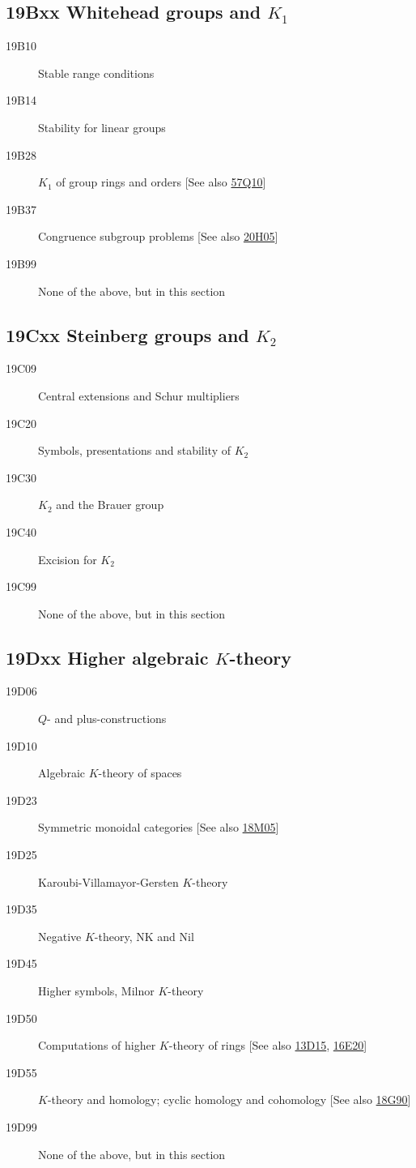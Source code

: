 \subsection*{19Bxx  Whitehead groups and $K_1$ }\label{19Bxx}
\begin{description}  
\item [19B10]\label{19B10} Stable range conditions
\item [19B14]\label{19B14} Stability for linear groups
\item [19B28]\label{19B28} $K_1$ of group rings and orders [See also \hyperref[57Q10]{57Q10}]
\item [19B37]\label{19B37} Congruence subgroup problems [See also \hyperref[20H05]{20H05}]
\item [19B99]\label{19B99} None of the above, but in this section
\end{description}
\subsection*{19Cxx  Steinberg groups and $K_2$ }\label{19Cxx}
\begin{description}  
\item [19C09]\label{19C09} Central extensions and Schur multipliers
\item [19C20]\label{19C20} Symbols, presentations and stability of $K_2$
\item [19C30]\label{19C30} $K_2$ and the Brauer group
\item [19C40]\label{19C40} Excision for $K_2$
\item [19C99]\label{19C99} None of the above, but in this section
\end{description}
\subsection*{19Dxx  Higher algebraic $K$-theory }\label{19Dxx}
\begin{description}  
\item [19D06]\label{19D06} $Q$- and plus-constructions
\item [19D10]\label{19D10} Algebraic $K$-theory of spaces
\item [19D23]\label{19D23} Symmetric monoidal categories [See also \hyperref[18M05]{18M05}]
\item [19D25]\label{19D25} Karoubi-Villamayor-Gersten $K$-theory
\item [19D35]\label{19D35} Negative $K$-theory, NK and Nil
\item [19D45]\label{19D45} Higher symbols, Milnor $K$-theory
\item [19D50]\label{19D50} Computations of higher $K$-theory of rings [See also \hyperref[13D15]{13D15}, \hyperref[16E20]{16E20}]
\item [19D55]\label{19D55} $K$-theory and homology; cyclic homology and cohomology [See also \hyperref[18G90]{18G90}]
\item [19D99]\label{19D99} None of the above, but in this section
\end{description}
